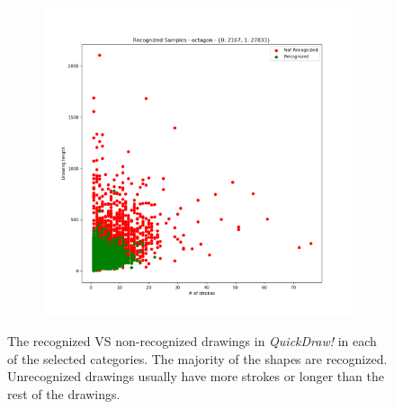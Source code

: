 \begin{figure}
\begin{subfigure}{0.3\textwidth}
    \end{subfigure}
    ~
    \begin{subfigure}{0.3\textwidth}
        \includegraphics[scale=0.28]{images/dataset/recog_octagon.png}
    \end{subfigure}

    \caption{The recognized VS non-recognized drawings in \textit{QuickDraw!} in each of the selected categories. The majority of the shapes are recognized. Unrecognized drawings usually have more strokes or longer than the rest of the drawings.}

    \label{fig:recognition}
\end{figure}

